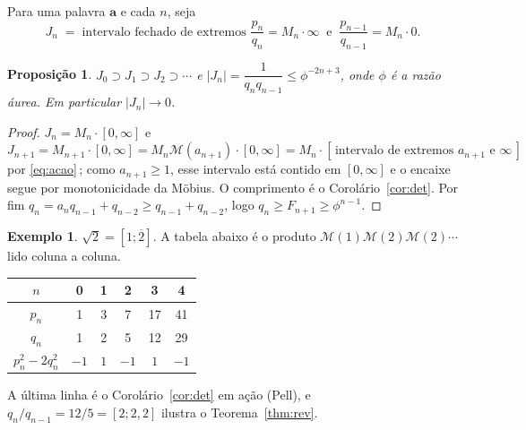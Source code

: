 \documentclass[11pt,a4paper]{article}
\theoremstyle{plain}
\newtheorem{proposicao}[teorema]{Proposição}
\theoremstyle{definition}
\newtheorem{exemplo}[teorema]{Exemplo}
\theoremstyle{remark}
\newcommand{\Mat}[1]{\mathcal{M}(#1)}
\newcommand{\cf}[2]{[#1;#2]}
\begin{document}
Para uma palavra $\mathbf a$ e cada $n$, seja
\[
  J_n \;=\; \text{intervalo fechado de extremos } \frac{p_n}{q_n} = M_n\cdot\infty
  \ \text{ e } \ \frac{p_{n-1}}{q_{n-1}} = M_n\cdot 0 .
\]

\begin{proposicao}\label{prop:encaixe}
$J_0 \supset J_1 \supset J_2 \supset \cdots$ e $|J_n| = \dfrac{1}{q_nq_{n-1}} \leq \phi^{-2n+3}$,
onde $\phi$ é a razão áurea. Em particular $|J_n|\to 0$.
\end{proposicao}

\begin{proof}
$J_n = M_n\cdot[0,\infty]$ e $J_{n+1} = M_{n+1}\cdot[0,\infty] = M_n\Mat{a_{n+1}}\cdot[0,\infty]
= M_n\cdot[\,\text{intervalo de extremos } a_{n+1} \text{ e } \infty\,]$ por \eqref{eq:acao}$\,$;
como $a_{n+1}\geq 1$, esse intervalo está contido em $[0,\infty]$ e o encaixe segue por
monotonicidade da Möbius. O comprimento é o Corolário~\ref{cor:det}. Por fim
$q_n = a_nq_{n-1}+q_{n-2} \geq q_{n-1}+q_{n-2}$, logo $q_n \geq F_{n+1} \geq \phi^{n-1}$.
\end{proof}

\begin{center}
\end{center}

\begin{exemplo}
$\sqrt2 = \cf{1}{\overline{2}}$. A tabela abaixo é o produto $\Mat1\Mat2\Mat2\cdots$ lido coluna a coluna.
\begin{center}
\begin{tabular}{cccccc}
\toprule
$n$ & 0 & 1 & 2 & 3 & 4\\
\midrule
$p_n$ & 1 & 3 & 7 & 17 & 41\\
$q_n$ & 1 & 2 & 5 & 12 & 29\\
$p_n^2-2q_n^2$ & $-1$ & $1$ & $-1$ & $1$ & $-1$\\
\bottomrule
\end{tabular}
\end{center}
A última linha é o Corolário~\ref{cor:det} em ação (Pell), e $q_n/q_{n-1} = 12/5 = \cf{2}{2,2}$
ilustra o Teorema~\ref{thm:rev}.
\end{exemplo}
\end{document}

